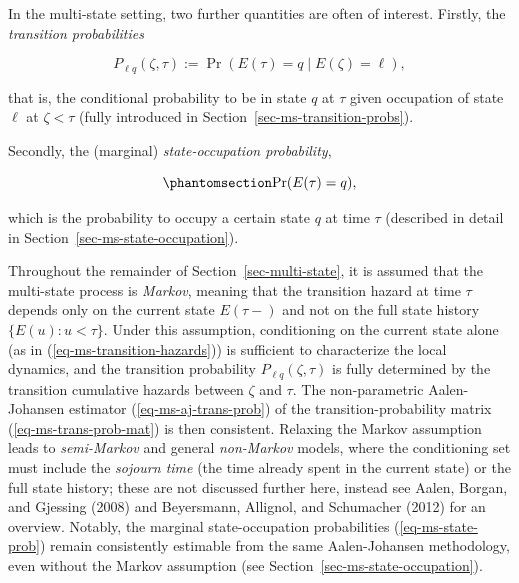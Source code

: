 \documentclass[
  letterpaper,
  krantz2]{style/krantz}
\begin{document}
In the multi-state setting, two further quantities are often of
interest. Firstly, the \emph{transition
probabilities}

\[
P_{\ell q}(\zeta, \tau):= \Pr(E(\tau) = q \mid E(\zeta) = \ell),
\]

that is, the conditional probability to be in state \(q\) at \(\tau\)
given occupation of state \(\ell\) at \(\zeta < \tau\) (fully introduced
in Section~\ref{sec-ms-transition-probs}).

Secondly, the (marginal) \emph{state-occupation
probability},

\begin{equation}\phantomsection\label{eq-ms-state-prob}{
\Pr(E(\tau) = q),
}\end{equation}

which is the probability to occupy a certain state \(q\) at time
\(\tau\) (described in detail in Section~\ref{sec-ms-state-occupation}).

Throughout the remainder of Section~\ref{sec-multi-state}, it is assumed
that the multi-state process is \emph{Markov}, meaning
that the transition hazard at time \(\tau\) depends only on the current
state \(E(\tau-)\) and not on the full state history
\(\{E(u) : u < \tau\}\). Under this assumption, conditioning on the
current state alone (as in (\ref{eq-ms-transition-hazards})) is
sufficient to characterize the local dynamics, and the transition
probability \(P_{\ell q}(\zeta,\tau)\) is fully determined by the
transition cumulative hazards between \(\zeta\) and \(\tau\). The
non-parametric Aalen-Johansen estimator
(\ref{eq-ms-aj-trans-prob}) of the transition-probability matrix
(\ref{eq-ms-trans-prob-mat}) is then consistent. Relaxing the Markov
assumption leads to \emph{semi-Markov} and general
\emph{non-Markov} models, where the conditioning set must include the
\emph{sojourn time} (the time already spent in the current state) or the
full state history; these are not discussed further here, instead see
Aalen, Borgan, and Gjessing (2008) and Beyersmann, Allignol, and
Schumacher (2012) for an overview. Notably, the marginal
state-occupation probabilities (\ref{eq-ms-state-prob}) remain
consistently estimable from the same Aalen-Johansen methodology, even
without the Markov assumption (see
Section~\ref{sec-ms-state-occupation}).
\end{document}
